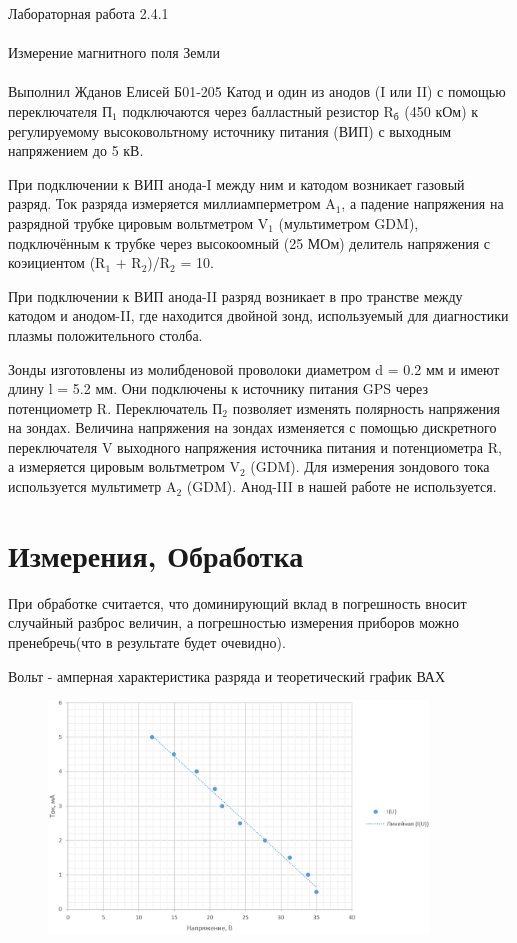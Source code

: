 \documentclass{astroedu-lab}
\begin{document}
\begin{problem}{\huge Лабораторная работа 2.4.1\\\\Измерение магнитного поля Земли\\\\Выполнил Жданов Елисей Б01-205}
Катод и один из анодов (I или II) с помощью переключателя П$_1$ подключаются
через балластный резистор R$_\text{б}$ (450 кОм) к регулируемому высоковольтному
источнику питания (ВИП) с выходным напряжением до 5 кВ.

При подключении к ВИП анода-I между ним и катодом возникает газовый разряд. Ток разряда измеряется миллиамперметром A$_1$, а падение напряжения на разрядной трубке цировым вольтметром V$_1$ (мультиметром GDM), подключённым к трубке через высокоомный (25 МОм) делитель напряжения с коэициентом (R$_1$ + R$_2$)/R$_2$ = 10.

При подключении к ВИП анода-II разряд возникает в про
транстве между катодом и анодом-II, где находится двойной зонд, используемый для диагностики плазмы положительного столба.

Зонды изготовлены из молибденовой проволоки диаметром d = 0.2 мм и имеют длину l = 5.2 мм. Они подключены к источнику питания GPS через потенциометр R. Переключатель П$_2$ позволяет изменять полярность напряжения на зондах. Величина напряжения на зондах изменяется с помощью дискретного переключателя V выходного напряжения источника питания и потенциометра R, а измеряется цировым вольтметром V$_2$ (GDM). Для измерения зондового тока используется
мультиметр A$_2$ (GDM). Анод-III в нашей работе не используется.

\section{Измерения, Обработка}

При обработке считается, что доминирующий вклад в погрешность вносит случайный разброс величин, а погрешностью измерения приборов можно пренебречь(что в результате будет очевидно).

Вольт - амперная характеристика разряда и теоретический график ВАХ

\newpage

\begin{figure}[!h]
	\centering
	\includegraphics[width=0.9\textwidth]{вах.png}
	\label{fig:boiler}
\end{figure}


\end{problem}
\end{document}

